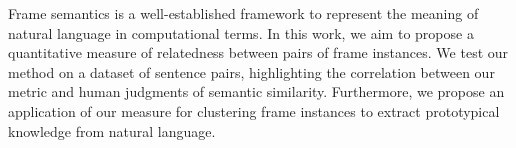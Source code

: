 Frame semantics is a well-established framework to represent the meaning of natural language in computational terms. In this work, we aim to propose a quantitative measure of relatedness between pairs of frame instances. We test our method on a dataset of sentence pairs, highlighting the correlation between our metric and human judgments of semantic similarity. Furthermore, we propose an application of our measure for clustering frame instances to extract prototypical knowledge from natural language.
